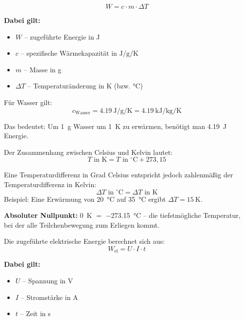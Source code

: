 \documentclass[11pt,a4paper]{scrartcl}
\begin{document}
	\begin{formelbox}[title={\faIcon{square-root-alt} Wärmeenergie}]
		\[W = c \cdot m \cdot \Delta T\]
		
		\textbf{Dabei gilt:}
		\begin{itemize}
			\item $W$ -- zugeführte Energie in J
			\item $c$ -- spezifische Wärmekapazität in $\si{\joule\per\gram\per\kelvin}$
			\item $m$ -- Masse in g
			\item $\Delta T$ -- Temperaturänderung in K (bzw. °C)
		\end{itemize}
	\end{formelbox}
	
	\begin{infobox}[title={\faIcon{info-circle} Spezifische Wärmekapazität von Wasser}]
		Für Wasser gilt:
		\[c_{\text{Wasser}} = \SI{4,19}{\joule\per\gram\per\kelvin} = \SI{4,19}{\kilo\joule\per\kilogram\per\kelvin}\]
		
		Das bedeutet: Um \SI{1}{\gram} Wasser um \SI{1}{\kelvin} zu erwärmen, benötigt man \SI{4,19}{\joule} Energie.
	\end{infobox}
\begin{hilfebox}[title={\faIcon{lightbulb} Umrechnung °C in K}]
	Der Zusammenhang zwischen Celsius und Kelvin lautet:
	\[T \text{ in K} = T \text{ in } ^\circ\text{C} + 273{,}15\]
	
	Eine Temperaturdifferenz in Grad Celsius entspricht jedoch zahlenmäßig der Temperaturdifferenz in Kelvin:
	\[\Delta T \text{ in } ^\circ\text{C} = \Delta T \text{ in K}\]
	Beispiel: Eine Erwärmung von \SI{20}{\celsius} auf \SI{35}{\celsius} ergibt $\Delta T = \SI{15}{\kelvin}$.
	
	\textbf{Absoluter Nullpunkt:} \SI{0}{\kelvin} $=$ \SI{-273,15}{\celsius} -- die tiefstmögliche Temperatur, bei der alle Teilchenbewegung zum Erliegen kommt.
\end{hilfebox}
	\begin{formelbox}[title={\faIcon{square-root-alt} Elektrische Energie}]
		Die zugeführte elektrische Energie berechnet sich aus:
		\[W_{\text{el}} = U \cdot I \cdot t\]
		
		\textbf{Dabei gilt:}
		\begin{itemize}
			\item $U$ -- Spannung in V
			\item $I$ -- Stromstärke in A
			\item $t$ -- Zeit in s
		\end{itemize}
	\end{formelbox}
	
\end{document}

